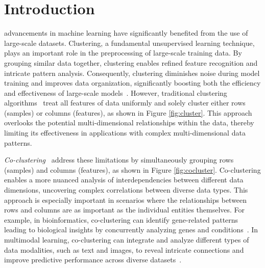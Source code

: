 \documentclass[journal]{IEEEtran}
\renewcommand{\cite}[1]{~\autocite{#1}}
\begin{document}
\section{Introduction}
 advancements in machine learning have significantly benefited from the use of large-scale datasets. Clustering, a fundamental unsupervised learning technique, plays an important role in the preprocessing of large-scale training data. By grouping similar data together, clustering enables refined feature recognition and intricate pattern analysis. Consequently, clustering diminishes noise during model training and improves data organization, significantly boosting both the efficiency and effectiveness of large-scale models\cite{raskutti2002CombiningClusteringCotraining, li2014ClusteringguidedSparseStructural, ghimatgar2018ImprovedFeatureSelection, li2023DistributedClusteringCooperative, bertsimas2020InterpretableClusteringOptimization}. However, traditional clustering algorithms\cite{lloyd1982LeastSquaresQuantization, arthur2007KmeansAdvantagesCareful, mclachlan1987MixtureModelsInference} treat all features of data uniformly and solely cluster either rows (samples) or columns (features), as shown in Figure \ref{fig:cluster}. This approach overlooks the potential multi-dimensional relationships within the data, thereby limiting its effectiveness in applications with complex multi-dimensional data patterns.

\textit{Co-clustering}\cite{cheng2000BiclusteringExpressionData, kluger2003SpectralBiclusteringMicroarray, yan2017CoclusteringMultidimensionalBig} address these limitations by simultaneously grouping rows (samples) and columns (features), as shown in Figure \ref{fig:cocluster}. Co-clustering enables a more nuanced analysis of interdependencies between different data dimensions, uncovering complex correlations between diverse data types. This approach is especially important in scenarios where the relationships between rows and columns are as important as the individual entities themselves. For example, in bioinformatics, co-clustering can identify gene-related patterns leading to biological insights by concurrently analyzing genes and conditions\cite{higham2007SpectralClusteringIts, kluger2003SpectralBiclusteringMicroarray, madeira2004BiclusteringAlgorithmsBiological, zhao2012BiclusteringAnalysisPattern, golchev2015BiclusteringAnalysisGene}.
In multimodal learning, co-clustering can integrate and analyze different types of data modalities, such as text and images, to reveal intricate connections and improve predictive performance across diverse datasets\cite{mu2022LearningHybridBehavior}.
\end{document}
